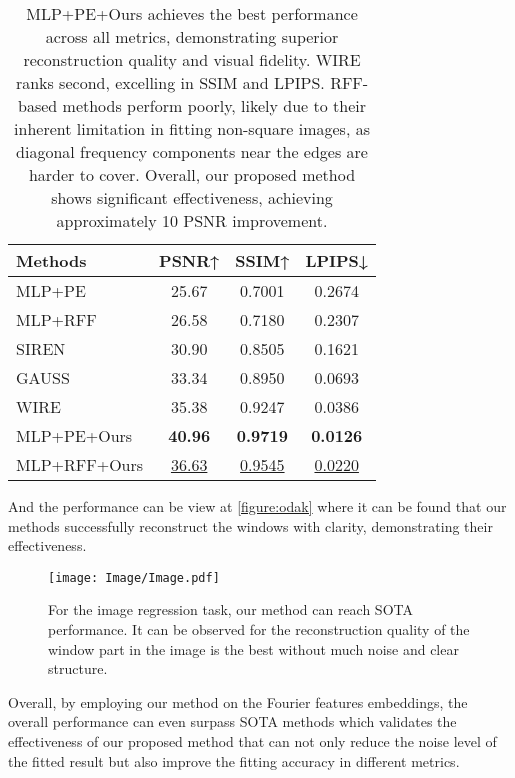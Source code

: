 \begin{table}[!ht]
\vspace{-10pt}
    \centering
    \caption{MLP+PE+Ours achieves the best performance across all metrics, demonstrating superior reconstruction quality and visual fidelity. WIRE ranks second, excelling in SSIM and LPIPS. RFF-based methods perform poorly, likely due to their inherent limitation in fitting non-square images, as diagonal frequency components near the edges are harder to cover. Overall, our proposed method shows significant effectiveness, achieving approximately 10 PSNR improvement.}
     \vspace{9pt}
    \begin{tabular}{lccc}
        \toprule
        Methods & PSNR↑ & SSIM↑ & LPIPS↓ \\
        \midrule
        MLP+PE        & 25.67 &0.7001 &  0.2674\\
        MLP+RFF       & 26.58 & 0.7180 & 0.2307 \\
        
        SIREN         & 30.90 & 0.8505& 0.1621\\
        GAUSS         & 33.34 & 0.8950 & 0.0693 \\
        WIRE          & 35.38 &  0.9247 &0.0386\\
        MLP+PE+Ours& \textbf{40.96} & \textbf{0.9719} & \textbf{0.0126} \\
        MLP+RFF+Ours&\underline{36.63} & \underline{0.9545}& \underline{0.0220} \\
        \bottomrule
    \end{tabular}
    \label{tab:odak}
   \vspace{-5pt}
\end{table}
And the performance can be view at \autoref{figure:odak} where it can be found that our methods successfully reconstruct the windows with clarity, demonstrating their effectiveness.
\begin{figure*}[!ht]
    \centering
    \texttt{[image: Image/Image.pdf]}
    \caption{For the image regression task, our method can reach SOTA performance. It can be observed for the reconstruction quality of the window part in the image is the best without much noise and clear structure.}
    \vspace{-10pt} 
    \label{figure:odak}
\end{figure*}
Overall, by employing our method on the Fourier features embeddings, the overall performance can even surpass SOTA methods which validates the effectiveness of our proposed method that can not only reduce the noise level of the fitted result but also improve the fitting accuracy in different metrics.

